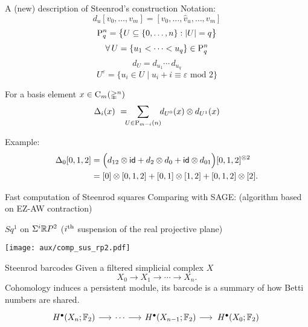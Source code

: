 \begin{frame}[fragile]{A (new) description of Steenrod's construction}
	\pause \vskip -5pt \textcolor{pblue}{Notation:} \vspace*{-5pt}
	\[
	d_u[v_0, \dots, v_m] = [v_0, \dots, \widehat v_u, \dots, v_m]
	\]
	\pause \vspace*{-15pt}
	\[
	\rP_q^n = \set[\big]{U \subseteq \{0, \dots, n\} : \bars{U} = q}
	\]
	\pause \vspace*{-15pt}
	\[
	\forall \, U = \{u_1 < \dots < u_q\} \in \rP_q^n
	\]
	\pause \vspace*{-15pt}
	\[
	d_U = d_{u_1} \dotsm \, d_{u_q}
	\]
	\pause \vspace*{-15pt}
	\[
	U^\varepsilon = \big\{ u_i \in U \mid u_i + i \equiv \varepsilon \text{ mod } 2 \big\}
	\]
	\pause \vskip -10pt
	\begin{definition}[Med.]
		For a basis element $x \in \gchains_m(\gsimplex^n)$
		\vspace*{-5pt}
		\[
		\Delta_i(x) \ = \!\!\! \sum_{U \in \rP_{m-i}(n)} \!\! d_{U^0}(x) \otimes d_{U^1}(x)
		\]
		\vspace*{-10pt}
	\end{definition}
	\pause \textcolor{pblue}{Example:} \vspace*{-5pt}
	\begin{align*}
	\Delta_0 [0,1,2] &=
	\Big( d_{12} \otimes \id + d_2 \otimes d_0 + \id \otimes d_{01} \Big) [0,1,2]^{\otimes 2} \\ &=
	[0] \otimes [0,1,2] + [0,1] \otimes [1,2] + [0,1,2] \otimes [2].
	\end{align*}
\end{frame}

\begin{frame}{Fast computation of Steenrod squares}
	\pause
	Comparing with SAGE: (algorithm based on EZ-AW contraction)

	\smallskip\pause
	\textcolor{pblue}{$Sq^1$} on \textcolor{pblue}{$\Sigma^i\R P^2$} ($i^\th$ suspension of the real projective plane)

	\medskip
	\texttt{[image: aux/comp\_sus\_rp2.pdf]}
\end{frame}

\begin{frame}[fragile]{Steenrod barcodes} \pause
	Given a filtered simplicial complex $X$
	\[
	X_0 \to X_1 \to \cdots \to X_n.
	\]
	\pause
	Cohomology induces a \textcolor{pblue}{persistent module}, its \textcolor{pblue}{barcode} is a summary of how Betti numbers are shared.
	\phantom{$Sq^k$ induces an endomorphism}
	\[
	\begin{tikzcd}[column sep = 15]
		H^\bullet(X_n; \Ftwo) \arrow[r] & \cdots \arrow[r] & H^\bullet(X_{n-1}; \Ftwo) \arrow[r] & \,H^\bullet(X_0; \Ftwo) \phantom{.}
	\end{tikzcd}
	\]
\end{frame}

